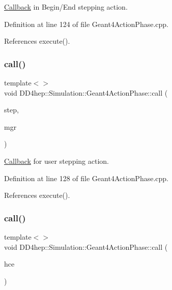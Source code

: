 \hyperlink{class_d_d4hep_1_1_callback}{Callback} in Begin/\+End stepping action. 



Definition at line 124 of file Geant4\+Action\+Phase.\+cpp.



References execute().

\hypertarget{class_d_d4hep_1_1_simulation_1_1_geant4_action_phase_aad0b3c79b2bc07c629073c068be77323}{}\label{class_d_d4hep_1_1_simulation_1_1_geant4_action_phase_aad0b3c79b2bc07c629073c068be77323} 
\subsubsection{\texorpdfstring{call()}{call()}\hspace{0.1cm}{\footnotesize\ttfamily [6/12]}}
{\footnotesize\ttfamily template$<$$>$ \\
void D\+D4hep\+::\+Simulation\+::\+Geant4\+Action\+Phase\+::call (\begin{DoxyParamCaption}\item[{const G4\+Step $\ast$}]{step,  }\item[{G4\+Stepping\+Manager $\ast$}]{mgr }\end{DoxyParamCaption})}



\hyperlink{class_d_d4hep_1_1_callback}{Callback} for user stepping action. 



Definition at line 128 of file Geant4\+Action\+Phase.\+cpp.



References execute().

\hypertarget{class_d_d4hep_1_1_simulation_1_1_geant4_action_phase_a3d3f9aa23aa2979499de53fc84a6a38b}{}\label{class_d_d4hep_1_1_simulation_1_1_geant4_action_phase_a3d3f9aa23aa2979499de53fc84a6a38b} 
\subsubsection{\texorpdfstring{call()}{call()}\hspace{0.1cm}{\footnotesize\ttfamily [7/12]}}
{\footnotesize\ttfamily template$<$$>$ \\
void D\+D4hep\+::\+Simulation\+::\+Geant4\+Action\+Phase\+::call (\begin{DoxyParamCaption}\item[{G4\+H\+Cof\+This\+Event $\ast$}]{hce }\end{DoxyParamCaption})}



